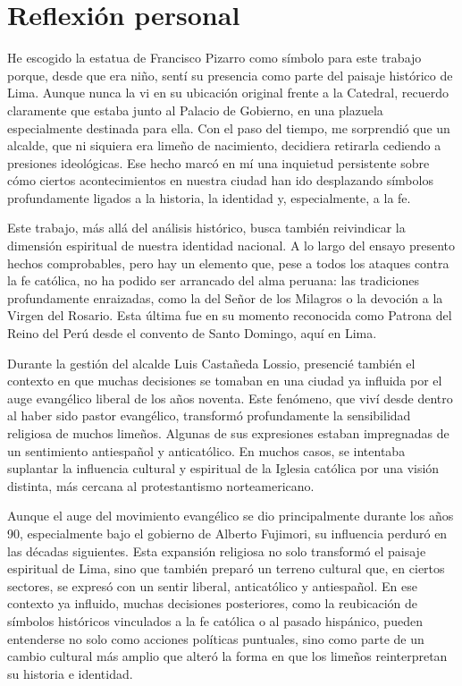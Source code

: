 \documentclass[a4paper,12pt]{article}
\begin{document}
\section{Reflexión personal}

He escogido la estatua de Francisco Pizarro como símbolo para este trabajo porque, desde que era niño, sentí su presencia como parte del paisaje histórico de Lima. Aunque nunca la vi en su ubicación original frente a la Catedral, recuerdo claramente que estaba junto al Palacio de Gobierno, en una plazuela especialmente destinada para ella. Con el paso del tiempo, me sorprendió que un alcalde, que ni siquiera era limeño de nacimiento, decidiera retirarla cediendo a presiones ideológicas. Ese hecho marcó en mí una inquietud persistente sobre cómo ciertos acontecimientos en nuestra ciudad han ido desplazando símbolos profundamente ligados a la historia, la identidad y, especialmente, a la fe.

Este trabajo, más allá del análisis histórico, busca también reivindicar la dimensión espiritual de nuestra identidad nacional. A lo largo del ensayo presento hechos comprobables, pero hay un elemento que, pese a todos los ataques contra la fe católica, no ha podido ser arrancado del alma peruana: las tradiciones profundamente enraizadas, como la del Señor de los Milagros o la devoción a la Virgen del Rosario. Esta última fue en su momento reconocida como Patrona del Reino del Perú desde el convento de Santo Domingo, aquí en Lima.

Durante la gestión del alcalde Luis Castañeda Lossio, presencié también el contexto en que muchas decisiones se tomaban en una ciudad ya influida por el auge evangélico liberal de los años noventa. Este fenómeno, que viví desde dentro al haber sido pastor evangélico, transformó profundamente la sensibilidad religiosa de muchos limeños. Algunas de sus expresiones estaban impregnadas de un sentimiento antiespañol y anticatólico. En muchos casos, se intentaba suplantar la influencia cultural y espiritual de la Iglesia católica por una visión distinta, más cercana al protestantismo norteamericano.

Aunque el auge del movimiento evangélico se dio principalmente durante los años 90, especialmente bajo el gobierno de Alberto Fujimori, su influencia perduró en las décadas siguientes. Esta expansión religiosa no solo transformó el paisaje espiritual de Lima, sino que también preparó un terreno cultural que, en ciertos sectores, se expresó con un sentir liberal, anticatólico y antiespañol. En ese contexto ya influido, muchas decisiones posteriores, como la reubicación de símbolos históricos vinculados a la fe católica o al pasado hispánico, pueden entenderse no solo como acciones políticas puntuales, sino como parte de un cambio cultural más amplio que alteró la forma en que los limeños reinterpretan su historia e identidad.
\end{document}
